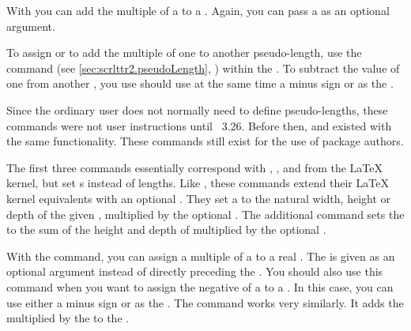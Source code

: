 With  you can add the multiple of a  to a
. Again, you can pass a  as an optional
argument.

To assign or to add the multiple of one  to another
pseudo-length, use the  command (see
\autoref{sec:scrlttr2.pseudoLength}, )
within the . To subtract the value of one 
from another , you use should use at the same time a
minus sign or  as the .

%
%
Since the ordinary user does not normally need to define pseudo-lengths, these
commands were not user instructions until \KOMAScript~3.26. Before then,
 and  existed with the
same functionality. These commands still exist for the use of package authors.%
\EndIndexGroup

\begin{Declaration}
\end{Declaration}
The first three
commands essentially correspond with ,
, and  from the \LaTeX{} kernel, but set
s instead of lengths. Like 
, these commands extend their \LaTeX{}
kernel equivalents with an optional . They set a
 to the natural width, height or depth of the given
, multiplied by the optional . The additional
command  sets the  to the
sum of the height and depth of  multiplied by the optional
.%
\EndIndexGroup


\begin{Declaration}
\end{Declaration}
With the  command, you can assign a multiple of a
 to a real .  The  is given
as an optional argument instead of directly preceding the
. You should also use this command when you want to
assign the negative of a  to a . In this
case, you can use either a minus sign or  as the .
The  command works very similarly. It adds the
 multiplied by the  to the .%
%
\EndIndexGroup


